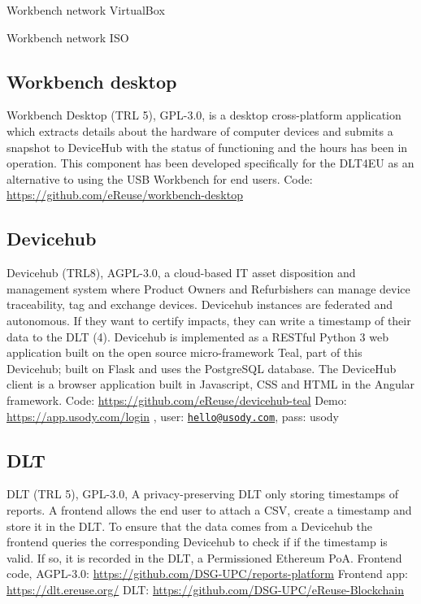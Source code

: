 \documentclass[
]{book}
\begin{document}
Workbench network VirtualBox

Workbench network ISO

\hypertarget{workbench-desktop}{%
\subsection{Workbench desktop}\label{workbench-desktop}}

Workbench Desktop (TRL 5), GPL-3.0, is a desktop cross-platform application which extracts details about the hardware of computer devices and submits a snapshot to DeviceHub with the status of functioning and the hours has been in operation. This component has been developed specifically for the DLT4EU as an alternative to using the USB Workbench for end users.
Code: \url{https://github.com/eReuse/workbench-desktop}

\hypertarget{devicehub}{%
\subsection{Devicehub}\label{devicehub}}

Devicehub (TRL8), AGPL-3.0, a cloud-based IT asset disposition and management system where Product Owners and Refurbishers can manage device traceability, tag and exchange devices. Devicehub instances are federated and autonomous. If they want to certify impacts, they can write a timestamp of their data to the DLT (4). Devicehub is implemented as a RESTful Python 3 web application built on the open source micro-framework Teal, part of this Devicehub; built on Flask and uses the PostgreSQL database. The DeviceHub client is a browser application built in Javascript, CSS and HTML in the Angular framework.
Code: \url{https://github.com/eReuse/devicehub-teal}
Demo: \url{https://app.usody.com/login} , user: \href{mailto:hello@usody.com}{\nolinkurl{hello@usody.com}}, pass: usody

\hypertarget{dlt}{%
\subsection{DLT}\label{dlt}}

DLT (TRL 5), GPL-3.0, A privacy-preserving DLT only storing timestamps of reports. A frontend allows the end user to attach a CSV, create a timestamp and store it in the DLT. To ensure that the data comes from a Devicehub the frontend queries the corresponding Devicehub to check if if the timestamp is valid. If so, it is recorded in the DLT, a Permissioned Ethereum PoA.
Frontend code, AGPL-3.0: \url{https://github.com/DSG-UPC/reports-platform}
Frontend app: \url{https://dlt.ereuse.org/}
DLT: \url{https://github.com/DSG-UPC/eReuse-Blockchain}
\end{document}
